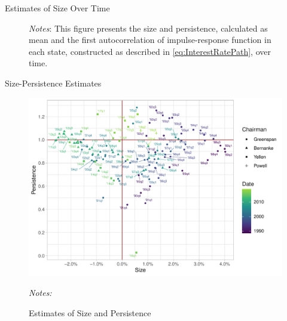 \documentclass[10pt,aspectratio=169]{beamer}
\begin{document}
\begin{frame}{Estimates of Size Over Time}
\begin{figure}[!htbp]
\begin{subfigure}[b]{0.49\textwidth}
        \end{subfigure} \vspace{-5ex}
            {\begin{flushleft}\tiny\textit{Notes}: This figure presents the size and persistence, calculated as mean and the first autocorrelation of impulse-response function in each state, constructed as described in \vref{eq:InterestRatePath}, over time. \end{flushleft}}
      \end{figure}
      
\end{frame}



\begin{frame}{Size-Persistence Estimates}
    \begin{figure}[!hpbt]\centering
        \begin{minipage}{0.6\textwidth}
          \caption{Estimates of Size and Persistence} 
          \label{fig:size_persistence_short}
          \includegraphics[width=\linewidth]{actual_size_persistence_short.pdf}
        {\begin{flushleft}\tiny \textit{Notes:} \end{flushleft}} 
          \end{minipage}
      \end{figure}
    
\end{frame}






\end{document}
